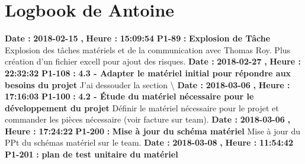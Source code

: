 \documentclass{article}%
\begin{document}
%
\normalsize%
\section{Logbook de Antoine}%
\textbf{Date : }%
\textbf{2018{-}02{-}15}%
\textbf{,}%
\textbf{ Heure : }%
\textbf{15:09:54}%
\newline%
%
\textbf{P1{-}89 }%
\textbf{ : }%
\textbf{ Explosion de Tâche}%
\newline%
\newline%
%
Explosion des tâches matériels et de la communication avec Thomas Roy. Plus création d'un fichier excell pour ajout des risques.\newline%
\newline%
%
\textbf{Date : }%
\textbf{2018{-}02{-}27}%
\textbf{,}%
\textbf{ Heure : }%
\textbf{22:32:32}%
\newline%
%
\textbf{P1{-}108 }%
\textbf{ : }%
\textbf{ 4.3 {-} Adapter le matériel initial pour répondre aux besoins du projet}%
\newline%
\newline%
%
J'ai dessouder la section \textbackslash{}\newline%
\newline%
%
\textbf{Date : }%
\textbf{2018{-}03{-}06}%
\textbf{,}%
\textbf{ Heure : }%
\textbf{17:16:03}%
\newline%
%
\textbf{P1{-}100 }%
\textbf{ : }%
\textbf{ 4.2 {-} Étude du matériel nécessaire pour le développement du projet}%
\newline%
\newline%
%
Définir le matériel nécessaire pour le projet et commander les pièces nécessaire (voir facture sur team). \newline%
\newline%
%
\textbf{Date : }%
\textbf{2018{-}03{-}06}%
\textbf{,}%
\textbf{ Heure : }%
\textbf{17:24:22}%
\newline%
%
\textbf{P1{-}200 }%
\textbf{ : }%
\textbf{ Mise à jour du schéma matériel}%
\newline%
\newline%
%
Mise à jour du PPt du schémas matériel sur le team.\newline%
\newline%
%
\textbf{Date : }%
\textbf{2018{-}03{-}08}%
\textbf{,}%
\textbf{ Heure : }%
\textbf{11:54:42}%
\newline%
%
\textbf{P1{-}201 }%
\textbf{ : }%
\textbf{ plan de test unitaire du matériel}%
\newline%
\newline%
\end{document}
